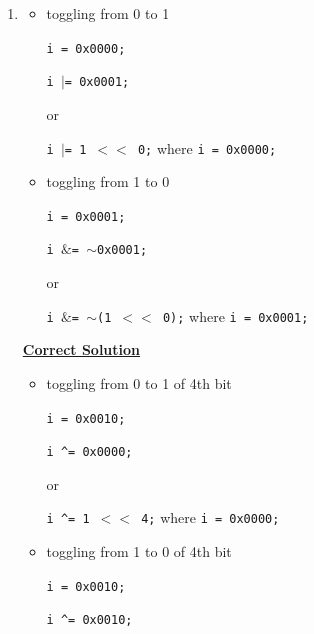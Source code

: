 \documentclass[12pt]{article}
\begin{document}
\begin{enumerate}[1.]
    \item

    \begin{itemize}
        \item toggling from 0 to 1

        \bigskip

        \texttt{i = 0x0000;}

        \texttt{i $\lvert$= 0x0001;}

        \bigskip

        or

        \bigskip

        \texttt{i $\lvert$= 1 $<<$ 0;} where \texttt{i = 0x0000;}

        \item toggling from 1 to 0

        \bigskip

        \texttt{i = 0x0001;}

        \texttt{i $\&$= $\sim$0x0001;}

        \bigskip

        or

        \bigskip

        \texttt{i $\&$= $\sim$(1 $<<$ 0);} where \texttt{i = 0x0001;}
    \end{itemize}

    \bigskip

    \begin{mdframed}
    \underline{\textbf{Correct Solution}}

    \begin{itemize}
        \item toggling from 0 to 1 of \color{red}4th bit\color{black}

        \bigskip

        \color{red}\texttt{i = 0x0010;}\color{black}

        \texttt{i \^{}= 0x0000;}

        \bigskip

        or

        \bigskip

        \texttt{i \^{}= 1 $<<$ 4;} where \texttt{i = 0x0000;}

        \item toggling from 1 to 0 of \color{red}4th bit\color{black}

        \bigskip

        \texttt{i = 0x0010;}

        \texttt{i \^{}= 0x0010;}


\end{itemize}
\end{mdframed}
\end{enumerate}
\end{document}
